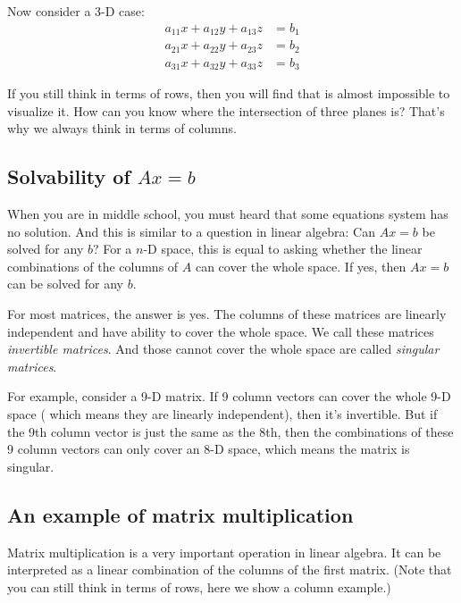 \documentclass[10pt,a4paper,oneside,numbers=noenddot]{scrbook}
\theoremstyle{ctplain}
\theoremstyle{ctresult}
\begin{document}
Now consider a 3-D case:
\begin{equation}
    \begin{aligned}
        a_{11}x + a_{12}y + a_{13}z &= b_1 \\
        a_{21}x + a_{22}y + a_{23}z &= b_2 \\
        a_{31}x + a_{32}y + a_{33}z &= b_3
    \end{aligned}
\end{equation}

If you still think in terms of rows, then you will find that is almost impossible to
visualize it. How can you know where the intersection of three planes is? That's why
we always think in terms of columns.

\subsection{Solvability of $Ax = b$}

When you are in middle school, you must heard that some equations system has no solution.
And this is similar to a question in linear algebra: Can $Ax = b$ be solved for any $b$?
For a $n$-D space, this is equal to asking whether the linear combinations of the columns of $A$ can
cover the whole space. If yes, then $Ax = b$ can be solved for any $b$.

For most matrices, the answer is yes. The columns of these matrices are linearly
independent and have ability to cover the whole space. We call these matrices
\emph{invertible matrices}. And those cannot cover the whole space are called
\emph{singular matrices}. 

For example, consider a 9-D matrix. If 9 column vectors can cover the whole 9-D space (
which means they are linearly independent), then it's invertible. But if the 9th column
vector is just the same as the 8th, then the combinations of these 9 column vectors can
only cover an 8-D space, which means the matrix is singular.

\subsection{An example of matrix multiplication}

Matrix multiplication is a very important operation in linear algebra. It can be
interpreted as a linear combination of the columns of the first matrix. (Note that you
can still think in terms of rows, here we show a column example.)
\end{document}

